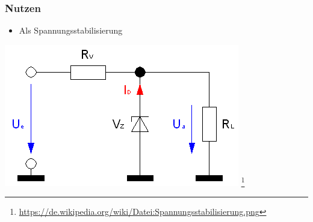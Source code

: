 \begin{frame}
    \frametitle{Nutzen}
      	\begin{itemize}
			\item Als Spannungsstabilisierung
    \end{itemize}    
    \begin{center}
        \includegraphics[width=.8\textwidth]{e12/Spannungsstabilisierung.png}
        \footnote{\tiny \url{https://de.wikipedia.org/wiki/Datei:Spannungsstabilisierung.png}}
	\end{center}
\end{frame}

